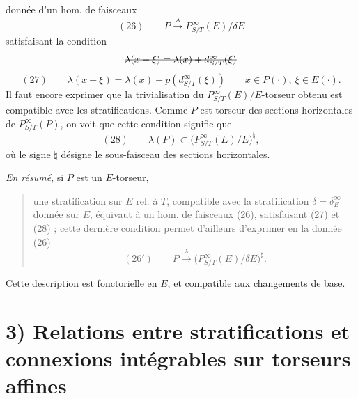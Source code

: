 \documentclass[11pt,a4paper]{article}
\begin{document}
donnée d'un hom. de faisceaux
\[
(26)\qquad P \xrightarrow{\ \lambda\ } P^\infty_{S/T}(E)/\delta E
\]
satisfaisant la condition
\[
\text{\struck{$\lambda(x + \xi) = \lambda(x) + d^\infty_{S/T}(\xi)$}}
\]
\[
(27)\qquad \lambda(x + \xi) = \lambda(x) + p(d^\infty_{S/T}(\xi)) \qquad x \in P(\cdot),\ \xi \in E(\cdot) .
\]
Il faut encore exprimer que la trivialisation du
$P^\infty_{S/T}(E)/E$-torseur obtenu est compatible avec les
stratifications. Comme $P$ est  torseur des
sections horizontales de $P^\infty_{S/T}(P)$, on voit que
 cette condition signifie que
\[
(28)\qquad \lambda(P) \subset \bigl(P^\infty_{S/T}(E)/E\bigr)^{\natural} ,
\]
où le \struck{\ill{}} signe $\natural$ désigne le sous-faisceau
des sections horizontales.

 \emph{En résumé}, \struck{\ill{}} si $P$ est un $E$-torseur,
\begin{quote}
une stratification sur $E$ rel. à $T$, compatible avec
la stratification $\delta = \delta^\infty_E$ donnée sur $E$, équivaut à
un hom. de faisceaux (26), satisfaisant
(27) et (28) ; cette dernière condition permet d'ailleurs
d'exprimer en  la donnée (26) 
\[
(26')\qquad P \xrightarrow{\ \lambda\ } \bigl(P^\infty_{S/T}(E)/\delta E\bigr)^{\natural} .
\]
\end{quote}

Cette description est fonctorielle en $E$, et
compatible aux changements de base.

\section{3) Relations entre stratifications et connexions intégrables sur torseurs affines}
\end{document}
